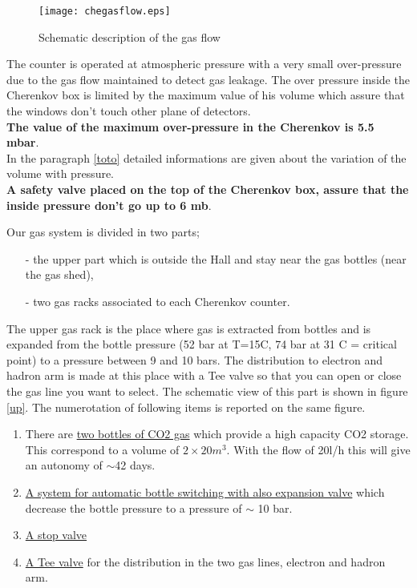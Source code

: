\documentclass[12pt]{article}
\begin{document}
\begin{figure}
\begin{center}
\texttt{[image: chegasflow.eps]}
{\linespread{1.}
\caption[Cherenkov gas flow]{Schematic description of the gas flow}
\label{down}}
\end{center}
\end{figure}

The counter is operated at atmospheric pressure with a very small
over-pressure due to the gas flow maintained to detect gas leakage. 
The over pressure inside the Cherenkov box is limited by the maximum value
of his volume which assure that the windows don't touch other plane
of detectors.\\ 
{\bf The value of the maximum over-pressure in the Cherenkov is 5.5 mbar}.\\
In the paragraph \ref{toto} detailed informations are given about the
 variation of the volume with pressure.\\
{\bf A safety valve placed on the top of the
Cherenkov box, assure that the inside pressure don't go up to 6 mb}.

\label{upi}

Our gas system is divided in two parts; 
\begin{itemize}
\item[-] the upper part which is outside the Hall and stay near the gas 
bottles (near the gas shed),
\item[-] two gas racks associated to each Cherenkov counter.
\end{itemize}
The upper gas rack is the place where gas is extracted from bottles and is
 expanded from the bottle pressure (52 bar at T=15C, 74 bar at 31 C 
= critical point) to a pressure between 9 and 10 bars. The distribution to 
electron and hadron arm is made at this place with a Tee valve so that you
can open or close the gas line you want to select. The schematic view of this
part is shown  in figure \ref{up}. The numerotation of following items is 
reported on the same figure.
\begin{enumerate}
\item There are \underline{two bottles of CO2 gas} 
which provide a high capacity CO2 storage. This correspond to a volume 
of $2\times 20m^3$. With the flow of 20l/h  this will give an autonomy 
of $\sim$42 days.
\item \underline{A system for automatic bottle switching with also expansion 
valve} which decrease the bottle pressure to a pressure of $\sim$ 10 bar.
\item \underline{A stop valve}
\item \underline{A Tee valve} for the distribution in the two gas lines, 
electron and hadron arm.
\end{enumerate}
\end{document}
